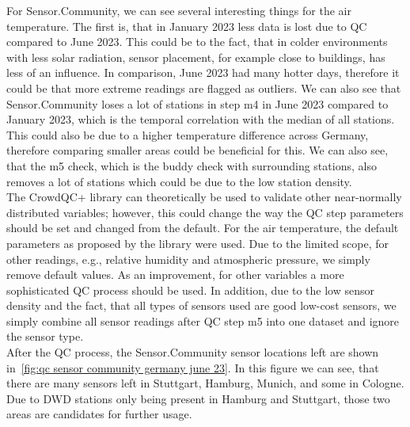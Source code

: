 For Sensor.Community, we can see several interesting things for the air temperature. The first is, that in January 2023 less data is lost due to QC compared to June 2023. This could be to the fact, that in colder environments with less solar radiation, sensor placement, for example close to buildings, has less of an influence. In comparison, June 2023 had many hotter days, therefore it could be that more extreme readings are flagged as outliers. We can also see that Sensor.Community loses a lot of stations in step m4 in June 2023 compared to January 2023, which is the temporal correlation with the median of all stations. This could also be due to a higher temperature difference across Germany, therefore comparing smaller areas could be beneficial for this. We can also see, that the m5 check, which is the buddy check with surrounding stations, also removes a lot of stations which could be due to the low station density.\\
The CrowdQC+ library can theoretically be used to validate other near-normally distributed variables; however, this could change the way the QC step parameters should be set and changed from the default. For the air temperature, the default parameters as proposed by the library were used. Due to the limited scope, for other readings, e.g., relative humidity and atmospheric pressure, we simply remove default values. As an improvement, for other variables a more sophisticated QC process should be used. In addition, due to the low sensor density and the fact, that all types of sensors used are good low-cost sensors, we simply combine all sensor readings after QC step m5 into one dataset and ignore the sensor type.\\
After the QC process, the Sensor.Community sensor locations left are shown in~\ref{fig:qc sensor community germany june 23}. In this figure we can see, that there are many sensors left in Stuttgart, Hamburg, Munich, and some in Cologne. Due to DWD stations only being present in Hamburg and Stuttgart, those two areas are candidates for further usage.

